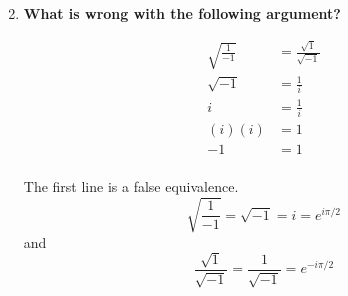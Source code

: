 \documentclass[9pt]{report}
\begin{document}
\begin{enumerate}
\[        \]
      \item \textbf{What is wrong with the following argument?}

        \[
          \begin{align}
          \sqrt{\frac{1}{-1}} &= \frac{\sqrt{1}}{\sqrt{-1} } \\
          \sqrt{-1} &= \frac{1}{i} \\
          i &= \frac{1}{i} \\
          (i)(i) &= 1 \\
          -1 &= 1\\
        \end{align}
        \]

        The first line is a false equivalence.
        \[
          \sqrt{\frac{1}{-1}} = \sqrt{-1} = i = e^{i\pi/2}
        \]
        and
        \[
          \frac{\sqrt{1}}{\sqrt{-1} }= \frac{1}{\sqrt{-1}} = e^{-i\pi/2}
        \]
  \end{enumerate}
\end{document}
